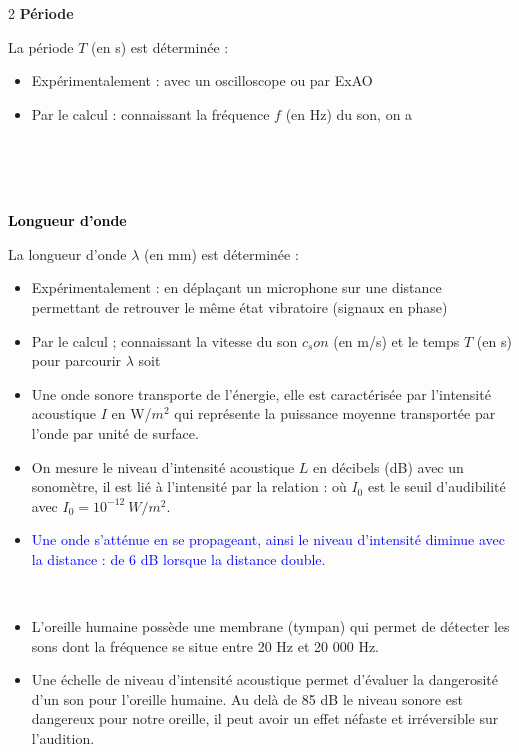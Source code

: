 \documentclass[11pt,a4paper]{article}
\begin{document}
\vfill
{}
\begin{multicols}{2}
\textbf{Période}

\color{blue}

La période $T$ (en s) est déterminée : 
\begin{itemize}
    \item Expérimentalement : avec un oscilloscope ou par ExAO
    \item Par le calcul : connaissant la fréquence $f$ (en Hz) du son, on a 
\end{itemize}
~~\\
~~\\
~~




\textcolor{black}{\textbf{Longueur d'onde}}

La longueur d'onde $\lambda$ (en mm) est déterminée : 
\begin{itemize}
  \item Expérimentalement : en déplaçant un microphone sur une distance permettant de retrouver le même état vibratoire (signaux en phase) 
  \item Par le calcul ; connaissant la vitesse du son $c_son$ (en m/s) et le temps $T$ (en s) pour parcourir $\lambda$ soit 
\end{itemize}

\end{multicols}
\vfill
{}
\begin{itemize}
\item Une onde sonore transporte de l'énergie, elle est caractérisée par l'intensité acoustique $I$ en W/$m^2$ qui représente la puissance moyenne transportée par l'onde par unité de surface. 
\item On mesure le niveau d'intensité acoustique $L$ en décibels (dB) avec un sonomètre, il est lié à l'intensité par la relation :  où $I_0$ est le seuil d'audibilité avec $I_0=10^{-12}~ W/m^2$.
\item \textcolor{blue}{Une onde s'atténue en se propageant, ainsi le niveau d'intensité diminue avec la distance : de 6 dB lorsque la distance double.}

\end{itemize}

\vfill

\\
\color{blue}
\begin{itemize}
    \item L'oreille humaine possède une membrane (tympan) qui permet de détecter les sons dont la fréquence se situe entre 20 Hz et 20 000 Hz.
    \item Une échelle de niveau d'intensité acoustique permet d'évaluer la dangerosité d'un son pour l'oreille humaine. Au delà de 85 dB le niveau sonore est dangereux pour notre oreille, il peut avoir un effet néfaste et irréversible sur l'audition. 
\end{itemize}
\vfill
\end{document}
